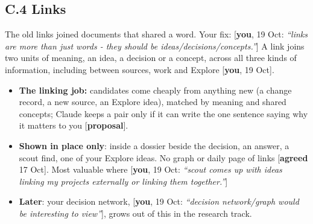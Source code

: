 \documentclass[10pt]{extarticle}
\newcommand{\you}[2]{{\small[\textbf{you}, #1: \textit{``#2''}]}}
\newcommand{\youx}[1]{{\small[\textbf{you}, #1]}}
\newcommand{\agreed}[1]{{\small[\textbf{agreed} #1]}}
\newcommand{\prop}{{\small[\textbf{proposal}]}}
\newcommand{\Sub}[1]{\subsection*{#1}}
\begin{document}
\Sub{C.4 Links}
The old links joined documents that shared a word. Your fix: \you{19 Oct}{links are more than just words - they should be ideas/decisions/concepts.} A link joins two units of meaning, an idea, a decision or a concept, across all three kinds of information, including between sources, work and Explore \youx{19 Oct}.
\begin{itemize}
\item \textbf{The linking job:} candidates come cheaply from anything new (a change record, a new source, an Explore idea), matched by meaning and shared concepts; Claude keeps a pair only if it can write the one sentence saying why it matters to you \prop.
\item \textbf{Shown in place only}: inside a dossier beside the decision, an answer, a scout find, one of your Explore ideas. No graph or daily page of links \agreed{17 Oct}. Most valuable where \you{19 Oct}{scout comes up with ideas linking my projects externally or linking them together.}
\item \textbf{Later}: your decision network, \you{19 Oct}{decision network/graph would be interesting to view}, grows out of this in the research track.
\end{itemize}
\end{document}
